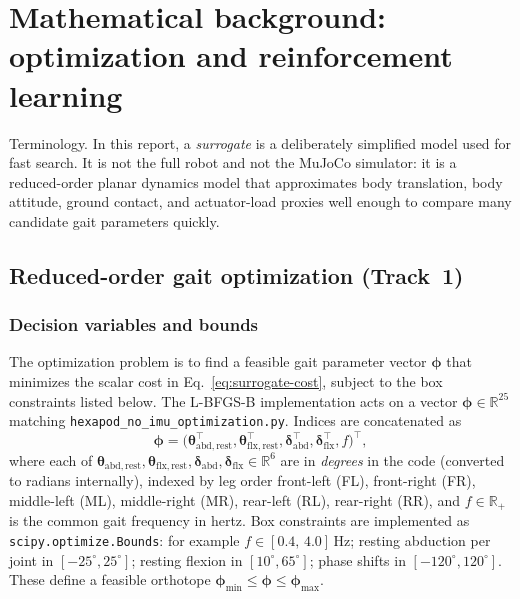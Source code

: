 \documentclass[11pt]{article}
\begin{document}
\section{Mathematical background: optimization and reinforcement learning}
\label{sec:math-bg}

Terminology. In this report, a \emph{surrogate} is a deliberately simplified model used for fast search. It is not the full robot and not the MuJoCo simulator: it is a reduced-order planar dynamics model that approximates body translation, body attitude, ground contact, and actuator-load proxies well enough to compare many candidate gait parameters quickly.

\subsection{Reduced-order gait optimization (Track~1)}
\label{sec:math-opt}

\subsubsection{Decision variables and bounds}
The optimization problem is to find a feasible gait parameter vector $\boldsymbol{\phi}$ that minimizes the scalar cost in Eq.~\eqref{eq:surrogate-cost}, subject to the box constraints listed below. The L-BFGS-B implementation acts on a vector $\boldsymbol{\phi}\in\mathbb{R}^{25}$ matching \texttt{hexapod\_no\_imu\_optimization.py}. Indices are concatenated as
\begin{equation}
  \boldsymbol{\phi} =
  \bigl(
  \boldsymbol{\theta}_{\mathrm{abd,rest}}^{\top},
  \boldsymbol{\theta}_{\mathrm{flx,rest}}^{\top},
  \boldsymbol{\delta}_{\mathrm{abd}}^{\top},
  \boldsymbol{\delta}_{\mathrm{flx}}^{\top},
  f
  \bigr)^{\top},
  \end{equation}
where each of $\boldsymbol{\theta}_{\mathrm{abd,rest}},\boldsymbol{\theta}_{\mathrm{flx,rest}},\boldsymbol{\delta}_{\mathrm{abd}},\boldsymbol{\delta}_{\mathrm{flx}}\in\mathbb{R}^{6}$ are in \emph{degrees} in the code (converted to radians internally), indexed by leg order front-left (FL), front-right (FR), middle-left (ML), middle-right (MR), rear-left (RL), rear-right (RR), and $f\in\mathbb{R}_{+}$ is the common gait frequency in hertz. Box constraints are implemented as \texttt{scipy.optimize.Bounds}: for example $f\in[0.4,\,4.0]$\,Hz; resting abduction per joint in $[-25^{\circ},25^{\circ}]$; resting flexion in $[10^{\circ},65^{\circ}]$; phase shifts in $[-120^{\circ},120^{\circ}]$. These define a feasible orthotope $\boldsymbol{\phi}_{\min}\le \boldsymbol{\phi}\le \boldsymbol{\phi}_{\max}$.
\end{document}
